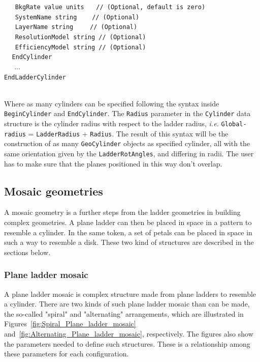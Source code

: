 $~~~~~~~${\tt BkgRate          value units                       $~~~$   // (Optional, default is zero)} \\
$~~~~~~~${\tt SystemName       string                          $~~~~~$   // (Optional)} \\
$~~~~~~~${\tt LayerName        string                         $~~~~~~$   // (Optional)} \\
$~~~~~~~${\tt ResolutionModel  string                                    // (Optional)} \\
$~~~~~~~${\tt EfficiencyModel  string                                    // (Optional)} \\
$~~~~~${\tt EndCylinder} \\
$~~~~~$ ... \\
{\tt EndLadderCylinder}

~\\
\noindent
Where as many cylinders can be specified following the syntax inside {\tt BeginCylinder} and {\tt EndCylinder}. The {\tt Radius} 
parameter in the {\tt Cylinder} data structure is the cylinder radius with respect to the ladder radius, {\it i.e.} {\tt Global-radius} = 
{\tt LadderRadius} + {\tt Radius}. The result of this syntax will be the construction of as many {\tt GeoCylinder} objects as 
specified cylinder, all with the same orientation given by the {\tt LadderRotAngles}, and differing in radii. The user has to 
make sure that the planes positioned in this way don't overlap.

\subsection{Mosaic geometries}
\label{subsec:Mosaic_geos}

A mosaic geometry is a further steps from the ladder geometries in building complex geometries. A plane ladder can then be placed in 
space in a pattern to resemble a cylinder. In the same token, a set of petals can be placed in space in such a way to resemble a disk.
These two kind of structures are described in the sections below.

\subsubsection{Plane ladder mosaic}

A plane ladder mosaic is complex structure made from plane ladders to resemble a cylinder. There are two kinds of such 
plane ladder mosaic than can be made, the so-called "spiral" and "alternating" arrangements, which are illustrated in 
Figures~\ref{fig:Spiral_Plane_ladder_mosaic} and~\ref{fig:Alternating_Plane_ladder_mosaic}, respectively. The figures also 
show the parameters needed to define such structures. These is a relationship among these parameters for each configuration.

